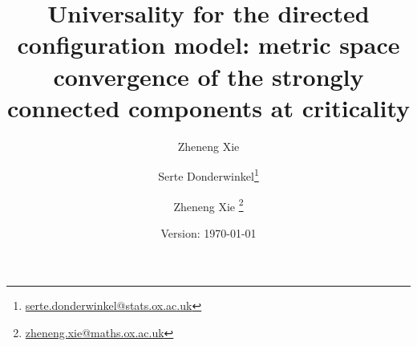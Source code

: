 \documentclass[notitlepage,11pt, a4paper]{article}
\title{Universality for the directed configuration model: metric space convergence of the strongly connected components at criticality}
\author{ \and Zheneng Xie}
\author{Serte Donderwinkel\thanks{\href{mailto:serte.donderwinkel@stats.ox.ac.uk}{serte.donderwinkel@stats.ox.ac.uk}} \and Zheneng Xie \thanks{\href{zheneng.xie@maths.ox.ac.uk}{zheneng.xie@maths.ox.ac.uk}}}
\date{Version: \today}
\begin{document}
\maketitle










\newpage 

\begin{appendices}
%


\end{appendices}



\end{document}
